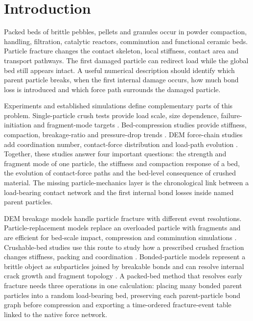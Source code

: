 \documentclass[preprint,12pt]{elsarticle}
\begin{document}
\section{Introduction}

Packed beds of brittle pebbles, pellets and granules occur in powder compaction, handling, filtration, catalytic reactors, comminution and functional ceramic beds. Particle fracture changes the contact skeleton, local stiffness, contact area and transport pathways. The first damaged particle can redirect load while the global bed still appears intact. A useful numerical description should identify which parent particle breaks, when the first internal damage occurs, how much bond loss is introduced and which force path surrounds the damaged particle.


Experiments and established simulations define complementary parts of this problem. Single-particle crush tests provide load scale, size dependence, failure-initiation and fragment-mode targets \cite{PlateMaterialLi4SiO4,Zhao2013FailureInitiationLi4SiO4,Annabattula2014SizeDependentCrush,Bhartia2020ElasticResponse,Tavares2022SingleParticleBreakageReview}. Bed-compression studies provide stiffness, compaction, breakage-ratio and pressure-drop trends \cite{ZaccariLoFrano2009CeramicPebbleBeds,PreliminaryLi4SiO4StructuralPerformance,CrushedPebblePressureDrop2024,Fang2026Li4SiO4BedCrushing}. DEM force-chain studies add coordination number, contact-force distribution and load-path evolution \cite{An2007DEMCeramicBreederBeds,GanKamlah2010DEMPebbleBeds,Wang2024ForceChainPebbleBed}. Together, these studies answer four important questions: the strength and fragment mode of one particle, the stiffness and compaction response of a bed, the evolution of contact-force paths and the bed-level consequence of crushed material. The missing particle-mechanics layer is the chronological link between a load-bearing contact network and the first internal bond losses inside named parent particles.


DEM breakage models handle particle fracture with different event resolutions. Particle-replacement models replace an overloaded particle with fragments and are efficient for bed-scale impact, compression and comminution simulations \cite{JimenezHerrera2018BreakageModels,Barrios2020ParticleBedBreakage,Zhou2020FragmentReplacementModes}. Crushable-bed studies use this route to study how a prescribed crushed fraction changes stiffness, packing and coordination \cite{Wang2021CrushableCeramicPebbleBed,CrushableDEMPebbleBed2026}. Bonded-particle models represent a brittle object as subparticles joined by breakable bonds and can resolve internal crack growth and fragment topology \cite{PotyondyCundall2004}. A packed-bed method that resolves early fracture needs three operations in one calculation: placing many bonded parent particles into a random load-bearing bed, preserving each parent-particle bond graph before compression and exporting a time-ordered fracture-event table linked to the native force network.
\end{document}
